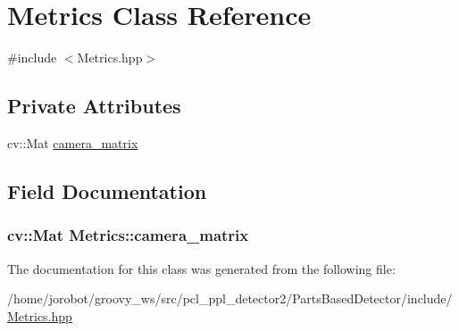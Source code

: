 \hypertarget{classMetrics}{\section{\-Metrics \-Class \-Reference}
\label{classMetrics}
}


{\ttfamily \#include $<$\-Metrics.\-hpp$>$}

\subsection*{\-Private \-Attributes}
\begin{DoxyCompactItemize}
\item 
cv\-::\-Mat \hyperlink{classMetrics_aba72e7e31eb9057d1252e61cdf3aa904}{camera\-\_\-matrix}
\end{DoxyCompactItemize}


\subsection{\-Field \-Documentation}
\hypertarget{classMetrics_aba72e7e31eb9057d1252e61cdf3aa904}{
\subsubsection[{camera\-\_\-matrix}]{\setlength{\rightskip}{0pt plus 5cm}cv\-::\-Mat {\bf \-Metrics\-::camera\-\_\-matrix}}}\label{classMetrics_aba72e7e31eb9057d1252e61cdf3aa904}


\-The documentation for this class was generated from the following file\-:\begin{DoxyCompactItemize}
\item 
/home/jorobot/groovy\-\_\-ws/src/pcl\-\_\-ppl\-\_\-detector2/\-Parts\-Based\-Detector/include/\hyperlink{Metrics_8hpp}{\-Metrics.\-hpp}\end{DoxyCompactItemize}
